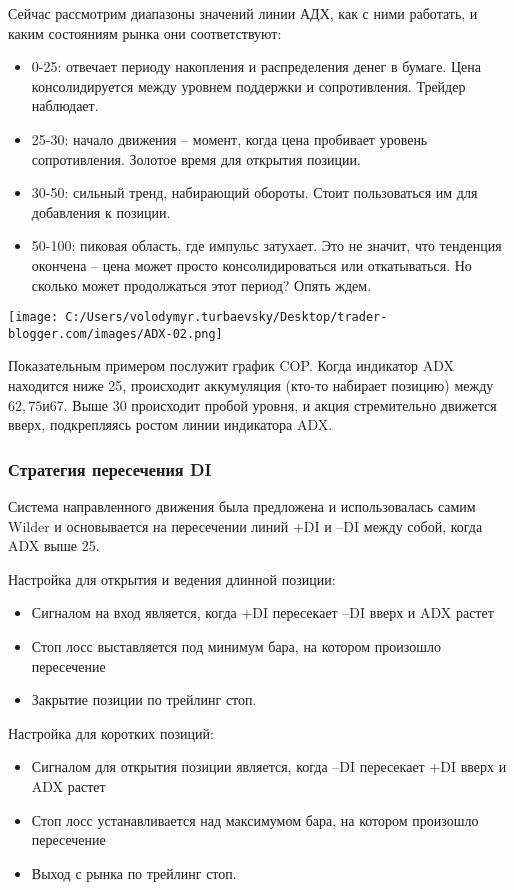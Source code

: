 \documentclass[a5paper]{article}
\begin{document}
Сейчас рассмотрим диапазоны значений линии АДХ, как с ними работать, и каким состояниям рынка они соответствуют:
\begin{itemize}
\item     0-25: отвечает периоду накопления и распределения денег в бумаге. Цена консолидируется между уровнем поддержки и сопротивления. Трейдер наблюдает.
\item     25-30: начало движения – момент, когда цена пробивает уровень сопротивления. Золотое время для открытия позиции.
\item     30-50: сильный тренд, набирающий обороты. Стоит пользоваться им для добавления к позиции.
\item     50-100: пиковая область, где импульс затухает. Это не значит, что тенденция окончена – цена может просто консолидироваться или откатываться. Но сколько может продолжаться этот период? Опять ждем.
\end{itemize}

\texttt{[image: C:/Users/volodymyr.turbaevsky/Desktop/trader-blogger.com/images/ADX-02.png]}

Показательным примером послужит график COP. Когда индикатор ADX
находится ниже 25, происходит аккумуляция (кто-то набирает позицию)
между $62,75 и $67. Выше 30 происходит пробой уровня, и акция
стремительно движется вверх, подкрепляясь ростом линии индикатора ADX.

\subsubsection{Стратегия пересечения DI}

Система направленного движения была предложена и использовалась самим Wilder и основывается на пересечении линий +DI и –DI между собой, когда ADX выше 25.

Настройка для открытия и ведения длинной позиции:
\begin{itemize}
\item     Сигналом на вход является, когда +DI пересекает –DI вверх и ADX растет
\item     Стоп лосс выставляется под минимум бара, на котором произошло пересечение
\item     Закрытие позиции по трейлинг стоп.
\end{itemize}

Настройка для коротких позиций:
\begin{itemize}
\item     Сигналом для открытия позиции является, когда –DI пересекает +DI вверх и ADX растет
\item     Стоп лосс устанавливается над максимумом бара, на котором произошло пересечение
\item     Выход с рынка по трейлинг стоп.
\end{itemize}
\end{document}
